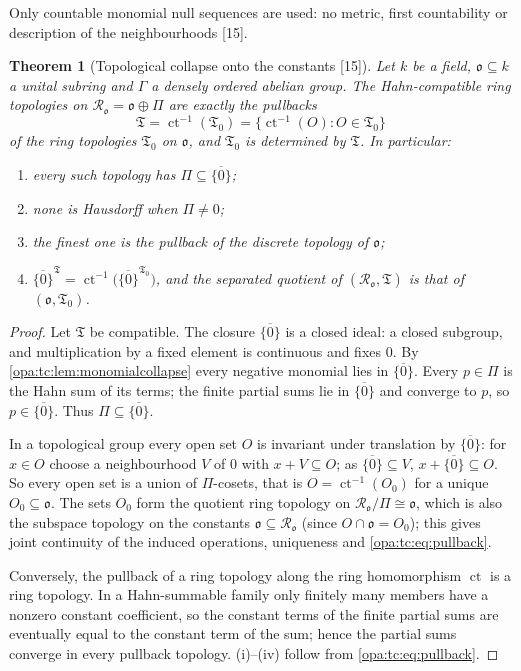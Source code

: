 \documentclass[11pt,oneside]{article}
\numberwithin{equation}{section}
\newtheorem{theorem}{Theorem}[section]
\theoremstyle{definition}
\theoremstyle{remark}
\newcommand{\oo}{\mathfrak o}
\newcommand{\Ro}{\mathcal R_{\oo}}
\newcommand{\ct}{\operatorname{ct}}
\newcommand{\src}[1]{\textup{\textsf{\small[#1]}}}
\begin{document}
Only countable monomial null sequences are used: no metric, first countability or description of
the neighbourhoods \src{15}.

\begin{theorem}[Topological collapse onto the constants \src{15}]\label{opa:tc:thm:topcollapse}
Let $k$ be a field, $\oo\subseteq k$ a unital subring and $\Gamma$ a densely ordered abelian group. The
Hahn-compatible ring topologies on $\Ro=\oo\oplus\Pi$ are exactly the pullbacks
\begin{equation}\label{opa:tc:eq:pullback}
 \mathfrak T=\ct^{-1}(\mathfrak T_0)=\{\ct^{-1}(O):O\in\mathfrak T_0\}
\end{equation}
of the ring topologies $\mathfrak T_0$ on $\oo$, and $\mathfrak T_0$ is determined by $\mathfrak T$. In
particular:
\begin{enumerate}[label=\textup{(\roman*)},itemsep=1pt]
\item every such topology has $\Pi\subseteq\overline{\{0\}}$;
\item none is Hausdorff when $\Pi\ne0$;
\item the finest one is the pullback of the discrete topology of $\oo$;
\item $\overline{\{0\}}^{\mathfrak T}=\ct^{-1}\bigl(\overline{\{0\}}^{\mathfrak T_0}\bigr)$, and the separated
quotient of $(\Ro,\mathfrak T)$ is that of $(\oo,\mathfrak T_0)$.
\end{enumerate}
\end{theorem}
\begin{proof}
Let $\mathfrak T$ be compatible. The closure $\overline{\{0\}}$ is a closed ideal: a closed subgroup, and
multiplication by a fixed element is continuous and fixes $0$. By \cref{opa:tc:lem:monomialcollapse}
every negative monomial lies in $\overline{\{0\}}$. Every $p\in\Pi$ is the Hahn sum of its terms; the
finite partial sums lie in $\overline{\{0\}}$ and converge to $p$, so $p\in\overline{\{0\}}$. Thus
$\Pi\subseteq\overline{\{0\}}$.

In a topological group every open set $O$ is invariant under translation by $\overline{\{0\}}$: for
$x\in O$ choose a neighbourhood $V$ of $0$ with $x+V\subseteq O$; as $\overline{\{0\}}\subseteq V$,
$x+\overline{\{0\}}\subseteq O$. So every open set
is a union of $\Pi$-cosets, that is $O=\ct^{-1}(O_0)$ for a unique $O_0\subseteq\oo$. The sets $O_0$ form
the quotient ring topology on $\Ro/\Pi\cong\oo$, which is also the subspace topology on the constants
$\oo\subseteq\Ro$ (since $O\cap\oo=O_0$); this gives joint continuity of the induced operations,
uniqueness and \eqref{opa:tc:eq:pullback}.

Conversely, the pullback of a ring topology along the ring homomorphism $\ct$ is a ring topology. In a
Hahn-summable family only finitely many members have a nonzero constant coefficient, so the constant
terms of the finite partial sums are eventually equal to the constant term of the sum; hence the
partial sums converge in every pullback topology. (i)--(iv) follow from \eqref{opa:tc:eq:pullback}.
\end{proof}
\end{document}
